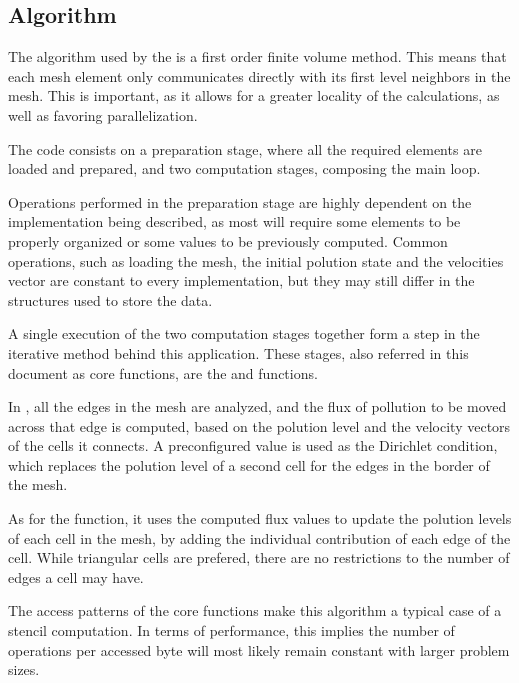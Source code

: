 \subsection{Algorithm}

The algorithm used by the \polu is a first order finite volume method. This means that each mesh element only communicates directly with its first level neighbors in the mesh. This is important, as it allows for a greater locality of the calculations, as well as favoring parallelization.

The code consists on a preparation stage, where all the required elements are loaded and prepared, and two computation stages, composing the main loop.

Operations performed in the preparation stage are highly dependent on the implementation being described, as most will require some elements to be properly organized or some values to be previously computed. Common operations, such as loading the mesh, the initial polution state and the velocities vector are constant to every implementation, but they may still differ in the structures used to store the data.

A single execution of the two computation stages together form a step in the iterative method behind this application. These stages, also referred in this document as core functions, are the \computeflux and \update functions.

In \computeflux, all the edges in the mesh are analyzed, and the flux of pollution to be moved across that edge is computed, based on the polution level and the velocity vectors of the cells it connects. A preconfigured value is used as the Dirichlet condition, which replaces the polution level of a second cell for the edges in the border of the mesh.

As for the \update function, it uses the computed flux values to update the polution levels of each cell in the mesh, by adding the individual contribution of each edge of the cell. While triangular cells are prefered, there are no restrictions to the number of edges a cell may have.

The access patterns of the core functions make this algorithm a typical case of a stencil computation. In terms of performance, this implies the number of operations per accessed byte will most likely remain constant with larger problem sizes.
